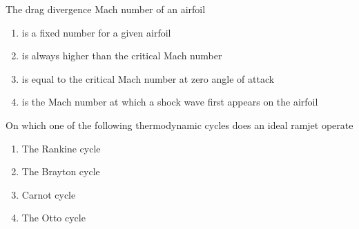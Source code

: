     \item The drag divergence Mach number of an airfoil
    \begin{enumerate}
        \item is a fixed number for a given airfoil
        \item is always higher than the critical Mach number 
        \item is equal to the critical Mach number at zero angle of attack
        \item is the Mach number at which a shock wave first appears on the airfoil\\
    \end{enumerate}

    \item On which one of the following thermodynamic cycles does an ideal ramjet operate
    \begin{enumerate}
        \item The Rankine cycle 
        \item The Brayton cycle
        \item Carnot cycle
        \item The Otto cycle\\
    \end{enumerate}
 
